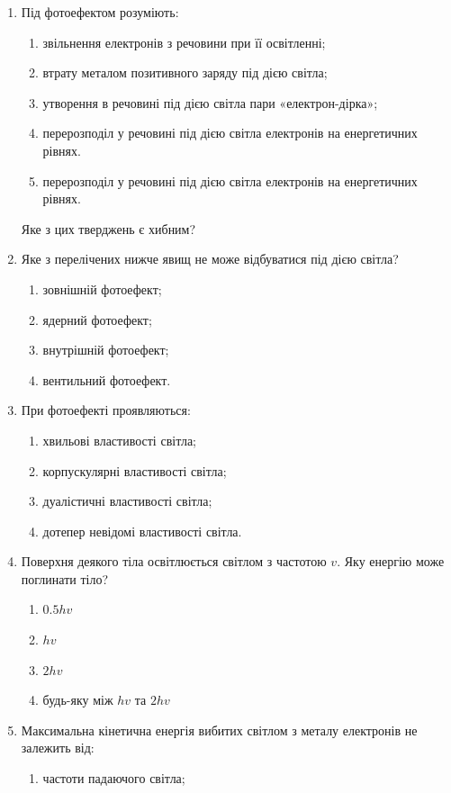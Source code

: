 \documentclass[twocolumn]{el-author}
\begin{document}
\begin{enumerate}
	\item Під фотоефектом розуміють:
	\begin{enumerate}
		\item звільнення електронів з речовини при її освітленні;
		\item втрату металом позитивного заряду під дією світла;
		\item утворення в речовині під дією світла 
			пари «електрон-дірка»;
		\item перерозподіл у речовині під дією світла електронів 
			на енергетичних рівнях.
		\item перерозподіл у речовині під дією світла електронів 
			на енергетичних рівнях.
	\end{enumerate}
	Яке з цих тверджень є хибним?
	\item Яке з перелічених нижче явищ не може відбуватися під дією світла?
	\begin{enumerate}
		\item зовнішній фотоефект;
		\item ядерний фотоефект;
		\item внутрішній фотоефект;
		\item вентильний фотоефект.
	\end{enumerate}
	\item При фотоефекті проявляються:
	\begin{enumerate}
		\item хвильові властивості світла;
		\item корпускулярні властивості світла;
		\item дуалістичні властивості світла;
		\item дотепер невідомі властивості світла.
	\end{enumerate}
	\item Поверхня деякого тіла освітлюється світлом з частотою $v$. 
		Яку енергію може поглинати тіло?
	\begin{enumerate}
		\item $0.5 hv$
		\item $hv$
		\item $2 hv$
		\item будь-яку між $hv$ та $2 hv$
	\end{enumerate}
	\item Максимальна кінетична енергія вибитих світлом з 
		металу електронів не залежить від:
	\begin{enumerate}
		\item частоти падаючого світла;

\end{enumerate}
\end{enumerate}
\end{document}

